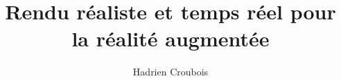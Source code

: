 


\title{Rendu réaliste et temps réel pour la réalité augmentée}
\author{Hadrien Croubois}



	







